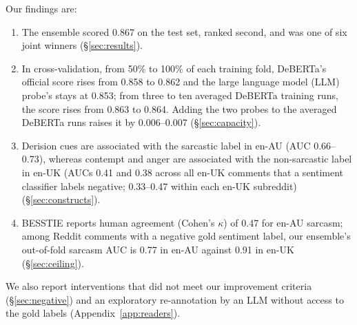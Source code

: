 \documentclass[11pt]{article}
\begin{document}
Our findings are:
\begin{enumerate}
\item The ensemble scored 0.867 on the test set, ranked second, and was one of six joint winners (\S\ref{sec:results}).
\item In cross-validation, from 50\% to 100\% of each training fold, DeBERTa's official score rises from 0.858 to
0.862 and the large language model (LLM) probe's stays at 0.853; from three to ten averaged DeBERTa training runs, the
score rises from 0.863 to 0.864. Adding the two probes to the averaged DeBERTa runs raises it by 0.006--0.007
(\S\ref{sec:capacity}).
\item Derision cues are associated with the sarcastic label in en-AU (AUC 0.66--0.73), whereas contempt and anger are
associated with the non-sarcastic label in en-UK (AUCs 0.41 and 0.38 across all en-UK comments that a sentiment
classifier labels negative; 0.33--0.47 within each en-UK subreddit)
(\S\ref{sec:constructs}).
\item BESSTIE reports human agreement (Cohen's $\kappa$) of 0.47 for en-AU sarcasm; among Reddit comments with a
negative gold sentiment label, our ensemble's out-of-fold sarcasm AUC is 0.77 in en-AU against 0.91 in en-UK
(\S\ref{sec:ceiling}).
\end{enumerate}
We also report interventions that did not meet our improvement criteria (\S\ref{sec:negative}) and an exploratory
re-annotation by an LLM without access to the gold labels (Appendix~\ref{app:readers}).
\end{document}
